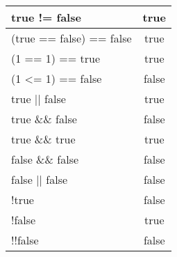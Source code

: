 \begin{table}[!ht]
\begin{threeparttable}
\begin{tabularx}{\textwidth}{|X|c|}
            true != false                                                    & true                \\
            \hline
            (true == false) == false                                         & true                \\
            \hline
            (1 == 1) == true                                                 & true                \\
            \hline
            (1 \textless{}= 1) == false                                      & false               \\
            \hline
            true || false                                                    & true                \\
            \hline
            true \&\& false                                                  & false               \\
            \hline
            true \&\& true                                                   & true                \\
            \hline
            false \&\& false                                                 & false               \\
            \hline
            false || false                                                   & false               \\
            \hline
            !true                                                            & false               \\
            \hline
            !false                                                           & true                \\
            \hline
            !!false                                                          & false               \\
            \hline
        \end{tabularx}
    \end{threeparttable}
    \vspace{\bottompaddingoftable}
\end{table}

\clearpage

